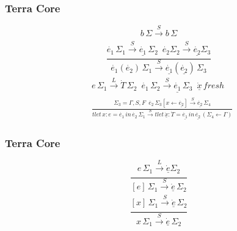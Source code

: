 \documentclass{beamer}
\begin{document}
\begin{frame}
	\frametitle{Terra Core}
  \begin{equation}
    b \, \Sigma \xrightarrow[]{S} b \, \Sigma \tag{SBAS}
  \end{equation}
  \newline
  \begin{equation}
    \frac{\dot{e_1} \, \Sigma_1 \xrightarrow[]{S} \underline{\dot{e_1}} \, \Sigma_2 \enspace \dot{e_2} \Sigma_2 \xrightarrow[]{S} \underline{\dot{e_2}} \Sigma_3}{\dot{e_1}(\dot{e_2}) \, \Sigma_1 \xrightarrow[]{S} \underline{\dot{e_1}}(\underline{\dot{e_2}}) \, \Sigma_3} \tag{SAPP}
  \end{equation}
  \newline
  \begin{equation}
    \begin{split}
      & e \, \Sigma_1 \xrightarrow[]{L} \dot{T} \, \Sigma_2 \enspace \dot{e_1} \, \Sigma_2  \xrightarrow[]{S} \underline{\dot{e_1}} \, \Sigma_3 \enspace \underline{\dot{x}} \, fresh \\
      & \frac{\Sigma_3 = \Gamma, S, F \enspace \dot{e_2} \, \Sigma_3[x \leftarrow \underline{\dot{e_2}}] \xrightarrow[]{S} \underline{\dot{e_2}} \, \Sigma_4}{tlet \, x: e = \dot{e_1} \, in \, \dot{e_2} \, \Sigma_1 \xrightarrow[]{S} tlet \, \underline{\dot{x}}: \dot{T} = \underline{\dot{e_1}} \, in \, \underline{\dot{e_2}} \, (\Sigma_4 \leftarrow \Gamma)}
    \end{split} \tag{SLET}
  \end{equation}
\end{frame}

\begin{frame}
	\frametitle{Terra Core}
  \begin{equation}
    \frac{e \, \Sigma_1 \xrightarrow[]{L} \underline{\dot{e}} \Sigma_2}{[e] \, \Sigma_1 \xrightarrow[]{S} \underline{\dot{e}} \, \Sigma_2} \tag{SESC}
  \end{equation}
  \newline
  \begin{equation}
    \frac{[x] \, \Sigma_1 \xrightarrow[]{S} \underline{\dot{e}} \, \Sigma_2}{x \, \Sigma_1 \xrightarrow[]{S} \underline{\dot{e}} \, \Sigma_2} \tag{SVAR}
  \end{equation}
\end{frame}
\end{document}
